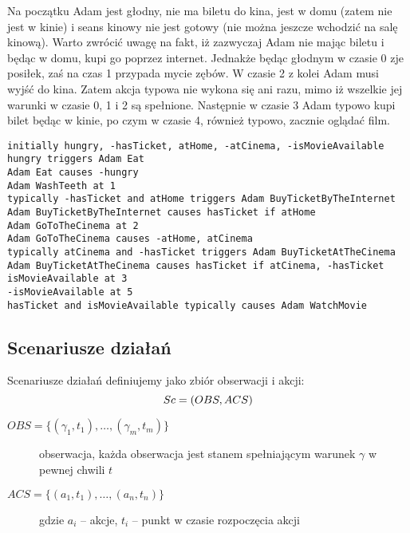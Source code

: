\begin{example}\label{przyk:syntaktyka_jezyka_akcji}
Na początku Adam jest głodny, nie ma biletu do kina, jest w domu (zatem nie jest w kinie) i seans kinowy nie jest gotowy (nie można jeszcze wchodzić na salę kinową). 
Warto zwrócić uwagę na fakt, iż zazwyczaj Adam nie mając biletu i będąc w domu, kupi go poprzez internet. 
Jednakże będąc głodnym w czasie 0 zje posiłek, zaś na czas 1 przypada mycie zębów. 
W czasie 2 z kolei Adam musi wyjść do kina. 
Zatem akcja typowa nie wykona się ani razu, mimo iż wszelkie jej warunki w czasie 0, 1 i 2 są spełnione. 
Następnie w czasie 3 Adam typowo kupi bilet będąc w kinie, po czym w czasie 4, również typowo, zacznie oglądać film.

	\begin{lstlisting}
initially hungry, -hasTicket, atHome, -atCinema, -isMovieAvailable
hungry triggers Adam Eat
Adam Eat causes -hungry
Adam WashTeeth at 1
typically -hasTicket and atHome triggers Adam BuyTicketByTheInternet
Adam BuyTicketByTheInternet causes hasTicket if atHome
Adam GoToTheCinema at 2
Adam GoToTheCinema causes -atHome, atCinema
typically atCinema and -hasTicket triggers Adam BuyTicketAtTheCinema
Adam BuyTicketAtTheCinema causes hasTicket if atCinema, -hasTicket
isMovieAvailable at 3
-isMovieAvailable at 5
hasTicket and isMovieAvailable typically causes Adam WatchMovie
	\end{lstlisting}
\end{example}


\subsection{Scenariusze działań}
\begin{definition}
Scenariusze działań definiujemy jako zbiór obserwacji i akcji:
\begin{equation}
	Sc = (OBS, ACS)\\
\end{equation}
\begin{description}
	\item[$OBS = \lbrace(\gamma_1, t_1), \dots, (\gamma_m, t_m)\rbrace$]
	obserwacja, każda obserwacja jest stanem spełniającym warunek $\gamma$ w pewnej chwili $t$
	\item[$ACS = \lbrace(a_1, t_1), \dots, (a_n, t_n) \rbrace$]
	gdzie $a_i$ -- akcje, $t_i$ -- punkt w czasie rozpoczęcia akcji
\end{description}
\end{definition}

